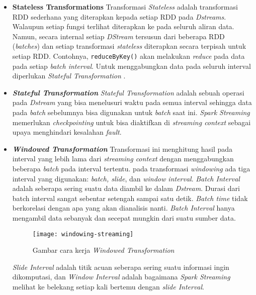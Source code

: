 \begin{itemize}
	\item[]{\textbf{Stateless Transformations}\newline
	Transformasi \textit{Stateless} adalah transformasi RDD sederhana yang diterapkan kepada 		setiap RDD pada \textit{Dstreams}. Walaupun setiap fungsi terlihat diterapkan ke pada seluruh aliran data. Namun, secara internal setiap \textit{DStream} tersusun dari beberapa RDD (\textit{batches}) dan setiap transformasi \textit{stateless} diterapkan secara terpisah untuk setiap RDD. Contohnya, 
	 \texttt{reduceByKey()} akan melakukan \textit{reduce} pada data pada setiap \textit{batch 		 interval}. Untuk menggabungkan data pada seluruh interval diperlukan \textit{Stateful 			 Transformation} .
	 }
	
	\item[]{\textbf{\textit{Stateful Transformation}}\newline
	\textit{Stateful Transformation} adalah sebuah operasi pada \textit{Dstream} yang bisa 			menelusuri waktu pada semua interval sehingga data pada \textit{batch} sebelumnya bisa 			digunakan untuk \textit{batch} saat ini.\newline
	\textit{Spark Streaming} memerlukan \textit{checkpointing} untuk bisa diaktifkan di 			\textit{streaming context} sebagai upaya menghindari kesalahan \textit{fault}. 
	}
	
	\item[]{\textbf{\textit{Windowed Transformation}}\newline
		Transformasi ini menghitung hasil pada interval yang lebih lama dari \textit{streaming 					context} dengan menggabungkan beberapa \textit{batch} pada interval tertentu.
		pada transformasi \textit{windowing} ada tiga interval yang digunakan: \textit{batch, 					slide}, dan \textit{window interval}. 
		\textit{Batch Interval} adalah seberapa sering suatu data diambil ke dalam \textit{Dstream}. 		Durasi dari batch interval sangat sebentar setengah sampai satu detik. \textit{Batch time} 				tidak berkorelasi dengan apa yang akan dianalisis nanti. \textit{Batch Interval} hanya 					mengambil data sebanyak dan secepat mungkin dari suatu sumber data. \newline
		
		\begin{figure}[H] 
		\centering  
		\texttt{[image: windowing-streaming]}  
		\caption[Gambar cara kerja \textit{Windowed Transformation}]{Gambar cara kerja 							\textit{Windowed Transformation}} 
		\label{fig:processing-events relationship} 
		\end{figure}
	}
		
\textit{Slide Interval} adalah titik acuan seberapa sering suatu informasi ingin 				dikomputasi, dan \textit{Window Interval} adalah bagaimana \textit{Spark Streaming} 			melihat ke belekang setiap kali bertemu dengan \textit{slide Interval}.

\end{itemize}


